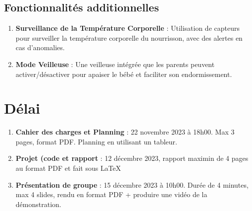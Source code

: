 \documentclass[12pt, letterpaper]{article}
\begin{document}
\subsection{Fonctionnalités additionnelles}
\begin{enumerate}
    \item \textbf{Surveillance de la Température Corporelle} : Utilisation de capteurs pour surveiller la température corporelle du nourrisson, avec des alertes en cas d'anomalies.
    \item \textbf{Mode Veilleuse} : Une veilleuse intégrée que les parents peuvent activer/désactiver pour apaiser le bébé et faciliter son endormissement.
\end{enumerate}


\section*{Délai}
\begin{enumerate}
    \item \textbf{Cahier des charges et Planning} : 22 novembre 2023 à 18h00. Max 3 pages, format PDF. Planning en utilisant un tableur.
    \item \textbf{Projet (code et rapport} : 12 décembre 2023, rapport maximin de 4 pages au format PDF et fait sous LaTeX
    \item \textbf{Présentation de groupe} : 15 décembre 2023 à 10h00. Durée de 4 minutes, max 4 slides, rendu en format PDF + produire une vidéo de la démonstration.
\end{enumerate}
\end{document}
